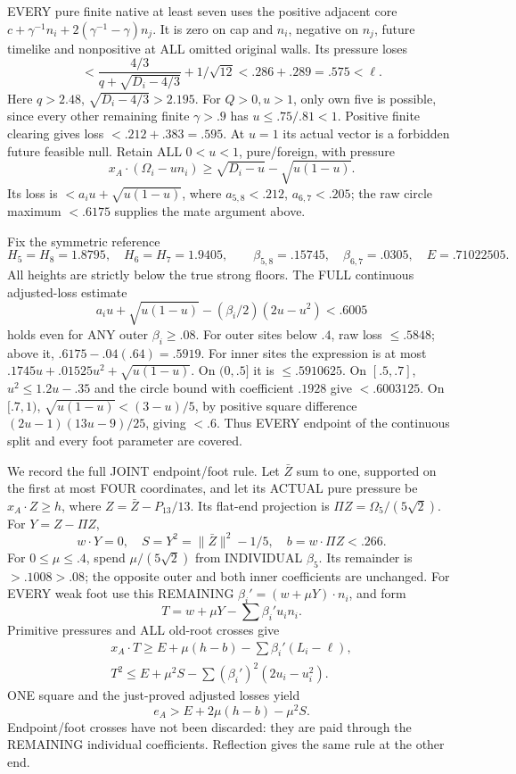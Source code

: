 \documentclass[11pt]{article}
\begin{document}
EVERY pure finite native at least seven uses
the positive adjacent core
\(c+\gamma^{-1}n_i+2(\gamma^{-1}-\gamma)n_j\).
It is zero on cap and \(n_i\), negative on
\(n_j\), future timelike and nonpositive at
ALL omitted original walls.
Its pressure loses
\[
       <{\frac{4/3}{q+\sqrt{D_i-4/3}}}+1/\sqrt{12}
                        <.286+.289=.575<\ell .
\]
Here \(q>2.48\),
\(\sqrt{D_i-4/3}>2.195\).
For \(Q>0,u>1\), only own five is possible,
since every other remaining finite \(\gamma>.9\)
has \(u\le.75/.81<1\).
Positive finite clearing gives loss
\(<.212+.383=.595\).
At \(u=1\) its actual vector is a forbidden
future feasible null.
Retain ALL \(0<u<1\), pure/foreign, with pressure
\[
 x_A\cdot(\Omega_i-un_i)\ge
                   \sqrt{D_i-u}-\sqrt{u(1-u)} .
\]
Its loss is \(<a_i u+\sqrt{u(1-u)}\), where
\(a_{5,8}<.212\), \(a_{6,7}<.205\);
the raw circle maximum \(<.6175\) supplies
the mate argument above.

Fix the symmetric reference
\[
 H_5=H_8=1.8795,\quad H_6=H_7=1.9405,\qquad
 \beta_{5,8}=.15745,\quad\beta_{6,7}=.0305,
 \quad E=.71022505 .
\]
All heights are strictly below the true
strong floors.
The FULL continuous adjusted-loss estimate
\[
 a_i u+\sqrt{u(1-u)}-(\beta_i/2)(2u-u^2)<.6005
\]
holds even for ANY outer \(\beta_i\ge.08\).
For outer sites below \(.4\), raw loss
\(\le.5848\); above it,
\(.6175-.04(.64)=.5919\).
For inner sites the expression is at most
\(.1745u+.01525u^2+\sqrt{u(1-u)}\).
On \((0,.5]\) it is \(\le.5910625\).
On \([.5,.7]\), \(u^2\le1.2u-.35\)
and the circle bound with coefficient \(.1928\)
give \(<.6003125\).
On \([.7,1)\),
\(\sqrt{u(1-u)}<(3-u)/5\),
by positive square difference
\((2u-1)(13u-9)/25\), giving \(<.6\).
Thus EVERY endpoint of the continuous split
and every foot parameter are covered.

We record the full JOINT endpoint/foot rule.
Let \(\bar Z\) sum to one, supported on the
first at most FOUR coordinates, and let its
ACTUAL pure pressure be \(x_A\cdot Z\ge h\),
where \(Z=\bar Z-P_{13}/13\).
Its flat-end projection is
\(\Pi Z=\Omega_5/(5\sqrt2)\).
For \(Y=Z-\Pi Z\),
\[
 w\cdot Y=0,\quad S=Y^2=\|\bar Z\|^2-1/5,\quad
                         b=w\cdot\Pi Z<.266 .
\]
For \(0\le\mu\le.4\), spend
\(\mu/(5\sqrt2)\) from INDIVIDUAL \(\beta_5\).
Its remainder is \(>.1008>.08\); the opposite
outer and both inner coefficients are unchanged.
For EVERY weak foot use this REMAINING
\(\beta_i'=(w+\mu Y)\cdot n_i\), and form
\[
                    T=w+\mu Y-\sum\beta_i' u_i n_i .
\]
Primitive pressures and ALL old-root crosses give
\[
 \begin{gathered}
 x_A\cdot T\ge E+\mu(h-b)-\sum\beta_i'(L_i-\ell),\\
 T^2\le E+\mu^2S-\sum(\beta_i')^2(2u_i-u_i^2).
 \end{gathered}
\]
ONE square and the just-proved adjusted losses
yield
\[
                           e_A>E+2\mu(h-b)-\mu^2S .
\tag{A12P}\label{eq:arithA12endpointpayment}
\]
Endpoint/foot crosses have not been discarded:
they are paid through the REMAINING individual
coefficients.
Reflection gives the same rule at the other end.
\end{document}
